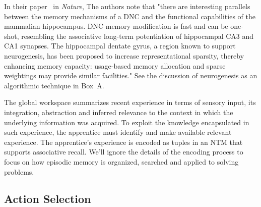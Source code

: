 \documentclass[letterpaper,11pt]{article}
\def\colorred#1{{\color{red}#1}}
\def\urlh#1{{}}
\begin{document}

In their paper~\cite{GravesetalNATURE-16} in {\it{Nature}}, The authors note that "there are interesting parallels between the memory mechanisms of a DNC and the functional capabilities of the mammalian hippocampus. DNC memory modification is fast and can be one-shot, resembling the associative long-term potentiation of hippocampal CA3 and CA1 synapses. The hippocampal dentate gyrus, a region known to support neurogenesis, has been proposed to increase representational sparsity, thereby enhancing memory capacity: usage-based memory allocation and sparse weightings may provide similar facilities." See the discussion of neurogenesis as an algorithmic technique in {\urlh{box_patterns}{Box~\colorred{A}}}.

The global workspace summarizes recent experience in terms of sensory input, its integration, abstraction and inferred relevance to the context in which the underlying information was acquired. To exploit the knowledge encapsulated in such experience, the apprentice must identify and make available relevant experience. The apprentice's experience is encoded as tuples in an NTM that supports associative recall. We'll ignore the details of the encoding process to focus on how episodic memory is organized, searched and applied to solving problems.


\subsection{Action Selection}
\label{subsection_action_selection}





\end{document}
